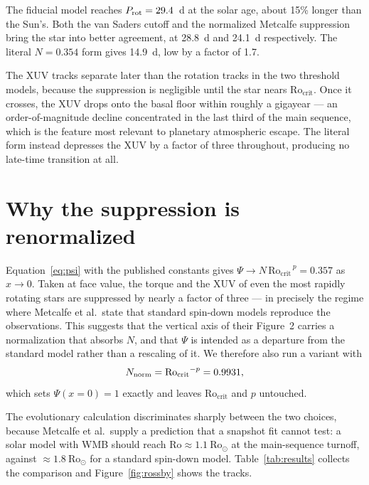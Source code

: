 \documentclass[11pt]{article}
\newcommand{\Rocrit}{\mathrm{Ro_{crit}}}
\newcommand{\Rosun}{\mathrm{Ro_\odot}}
\begin{document}
The fiducial model reaches $P_{\rm rot} = 29.4$~d at the solar age, about 15\%
longer than the Sun's. Both the van Saders cutoff and the normalized Metcalfe
suppression bring the star into better agreement, at 28.8~d and 24.1~d
respectively. The literal $N = 0.354$ form gives 14.9~d, low by a factor of
1.7.

The XUV tracks separate later than the rotation tracks in the two threshold
models, because the suppression is negligible until the star nears $\Rocrit$.
Once it crosses, the XUV drops onto the basal floor within roughly a
gigayear --- an order-of-magnitude decline concentrated in the last third of
the main sequence, which is the feature most relevant to planetary atmospheric
escape. The literal form instead depresses the XUV by a factor of three
throughout, producing no late-time transition at all.

\section{Why the suppression is renormalized}
\label{sec:renorm}

Equation~\ref{eq:psi} with the published constants gives
$\Psi \rightarrow N\,\Rocrit^{\,p} = 0.357$ as $x \rightarrow 0$. Taken at face
value, the torque and the XUV of even the most rapidly rotating stars are
suppressed by nearly a factor of three --- in precisely the regime where
Metcalfe et al.\ state that standard spin-down models reproduce the
observations. This suggests that the vertical axis of their Figure~2 carries a
normalization that absorbs $N$, and that $\Psi$ is intended as a departure from
the standard model rather than a rescaling of it. We therefore also run a
variant with
%
\begin{equation}
  N_{\rm norm} = \Rocrit^{-p} = 0.9931,
\end{equation}
%
which sets $\Psi(x\!=\!0) = 1$ exactly and leaves $\Rocrit$ and $p$ untouched.

The evolutionary calculation discriminates sharply between the two choices,
because Metcalfe et al.\ supply a prediction that a snapshot fit cannot test:
a solar model with WMB should reach $\mathrm{Ro} \approx 1.1~\Rosun$ at the
main-sequence turnoff, against $\approx 1.8~\Rosun$ for a standard spin-down
model. Table~\ref{tab:results} collects the comparison and
Figure~\ref{fig:rossby} shows the tracks.
\end{document}
